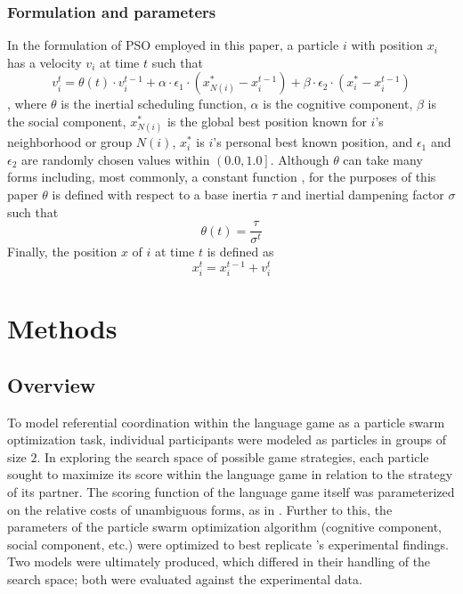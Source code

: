 \documentclass[12pt,a4paper]{article}
\begin{document}
\subsubsection{Formulation and parameters}
In the formulation of PSO employed in this paper, a particle $i$ with position $x_i$ has a velocity $v_i$ at time $t$ such that
\begin{equation}
v_i^t = \theta(t) \cdot v_i^{t-1} + \alpha \cdot \epsilon_1 \cdot (x_{N(i)}^* - x_i^{t-1}) + \beta \cdot \epsilon_2 \cdot (x_i^* - x_i^{t-1})
\end{equation},
where $\theta$ is the inertial scheduling function, $\alpha$ is the cognitive component, $\beta$ is the social component, $x_{N(i)}^*$ is the global best position known for $i$'s neighborhood or group $N(i)$, $x_i^*$ is $i$'s personal best known position, and $\epsilon_1$ and $\epsilon_2$ are randomly chosen values within $\left(0.0, 1.0\right]$. Although $\theta$ can take many forms including, most commonly, a constant function \citep[p.~101]{yang2014}, for the purposes of this paper $\theta$ is defined with respect to a base inertia $\tau$ and inertial dampening factor $\sigma$ such that
\begin{equation}
\theta(t) = \frac{\tau}{\sigma^t} 
\end{equation}
Finally, the position $x$ of $i$ at time $t$ is defined as
\begin{equation}
x_i^t = x_i^{t-1} + v_i^t 
\end{equation}

\section{Methods}

\subsection{Overview}

To model referential coordination within the \citeauthor{rohde2012} language game as a particle swarm optimization task, individual participants were modeled as particles in groups of size $2$. In exploring the search space of possible game strategies, each particle sought to maximize its score within the language game in relation to the strategy of its partner. The scoring function of the language game itself was parameterized on the relative costs of unambiguous forms, as in \citeauthor{rohde2012}. Further to this, the parameters of the particle swarm optimization algorithm (cognitive component, social component, etc.) were optimized to best replicate \citeauthor{rohde2012}'s experimental findings. Two models were ultimately produced, which differed in their handling of the search space; both were evaluated against the experimental data.
\end{document}
